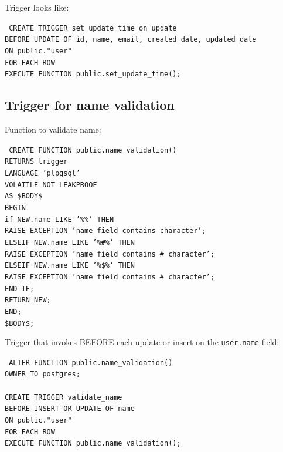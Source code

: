 Trigger looks like:

\texttt{
    CREATE TRIGGER set\_update\_time\_on\_update \\
    BEFORE UPDATE OF id, name, email, created\_date, updated\_date \\
    ON public."user" \\
    FOR EACH ROW \\
    EXECUTE FUNCTION public.set\_update\_time(); \\
}

\subsection{Trigger for name validation}\label{subsec:trigger-name-validation}

Function to validate name:

\texttt{
    CREATE FUNCTION public.name\_validation()\\
    RETURNS trigger\\
    LANGUAGE 'plpgsql'\\
    VOLATILE NOT LEAKPROOF\\
    AS \$BODY\$\\
    BEGIN\\
    if NEW.name LIKE '\%\@\%' THEN\\
    RAISE EXCEPTION 'name field contains \@ character';\\
    ELSEIF NEW.name LIKE '\%\#\%' THEN\\
    RAISE EXCEPTION 'name field contains \# character';\\
    ELSEIF NEW.name LIKE '\%\$\%' THEN\\
    RAISE EXCEPTION 'name field contains \# character';\\
    END IF;\\
    RETURN NEW;\\
    END;\\
    \$BODY\$;\\
}

Trigger that invokes BEFORE each update or insert on the \texttt{user.name} field:

\texttt{
    ALTER FUNCTION public.name\_validation() \\
    OWNER TO postgres; \\
    \\
    CREATE TRIGGER validate\_name \\
    BEFORE INSERT OR UPDATE OF name \\
    ON public."user" \\
    FOR EACH ROW \\
    EXECUTE FUNCTION public.name\_validation(); \\
}


